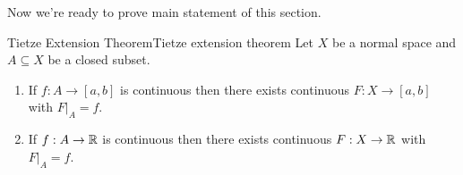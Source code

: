 \documentclass[12pt, a4paper, twoside]{article}
\theoremstyle{plain}
\begin{document}
\newpage

Now we're ready to prove main statement of this section. 

\begin{thm}{Tietze Extension Theorem}{Tietze extension theorem}
    Let $X$ be a normal space and $A \subseteq X$ be a closed subset. 
    \begin{enumerate}
        \item If $f: A \rightarrow [a, b]$ is continuous then there exists continuous $F: X \rightarrow [a, b]$ with $F|_A = f$. 
        \item If $f: A \rightarrow {\mathbb {R}}$ is continuous then there exists continuous $F: X \rightarrow {\mathbb {R}}$ with $F|_A = f$. 
    \end{enumerate}
\end{thm}
\end{document}
